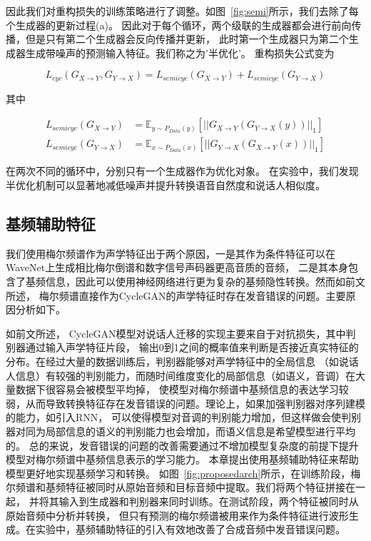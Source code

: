 因此我们对重构损失的训练策略进行了调整。如图~\ref{fig:semi}所示，我们去除了每个生成器的更新过程(a)。
因此对于每个循环，两个级联的生成器都会进行前向传播，但是只有第二个生成器会反向传播并更新，
此时第一个生成器只为第二个生成器生成带噪声的预测输入特征。我们称之为’半优化’。
重构损失公式变为

\begin{equation}
    L_{cyc}(G_{X\rightarrow Y},G_{Y\rightarrow X}) = L_{semicyc}(G_{X\rightarrow Y}) + L_{semicyc}(G_{Y\rightarrow X})
\end{equation}

其中

\begin{align}
    L_{semicyc}(G_{X\rightarrow Y}) & = \mathbb{E}_{y\sim P_{Data}(y)}\left[ \left| \left| G_{X\rightarrow Y}(G_{Y\rightarrow X}(y)) \right| \right|_1 \right] \\
    L_{semicyc}(G_{Y\rightarrow X}) & = \mathbb{E}_{x\sim P_{Data}(x)}\left[ \left| \left| G_{Y\rightarrow X}(G_{X\rightarrow Y}(x)) \right| \right|_1 \right]
\end{align}

在两次不同的循环中，分别只有一个生成器作为优化对象。
在实验中，我们发现半优化机制可以显著地减低噪声并提升转换语音自然度和说话人相似度。

\subsection{基频辅助特征}

我们使用梅尔频谱作为声学特征出于两个原因，一是其作为条件特征可以在WaveNet上生成相比梅尔倒谱和数字信号声码器更高音质的音频，
二是其本身包含了基频信息，因此可以使用神经网络进行更为复杂的基频隐性转换。然而如前文所述，
梅尔频谱直接作为CycleGAN的声学特征时存在发音错误的问题。主要原因分析如下。

如前文所述，
CycleGAN模型对说话人迁移的实现主要来自于对抗损失，其中判别器通过输入声学特征片段，
输出0到1之间的概率值来判断是否接近真实特征的分布。在经过大量的数据训练后，判别器能够对声学特征中的全局信息
（如说话人信息）有较强的判别能力，而随时间维度变化的局部信息（如语义，音调）在大量数据下很容易会被模型平均掉，
使模型对梅尔频谱中基频信息的表达学习较弱，从而导致转换特征存在发音错误的问题。理论上，如果加强判别器对序列建模的能力，如引入RNN，
可以使得模型对音调的判别能力增加，但这样做会使判别器对同为局部信息的语义的判别能力也会增加，而语义信息是希望模型进行平均的。
总的来说，发音错误的问题的改善需要通过不增加模型复杂度的前提下提升模型对梅尔频谱中基频信息表示的学习能力。
本章提出使用基频辅助特征来帮助模型更好地实现基频学习和转换。
如图~\ref{fig:proposedarch}所示，在训练阶段，梅尔频谱和基频特征被同时从原始音频和目标音频中提取。我们将两个特征拼接在一起，
并将其输入到生成器和判别器来同时训练。在测试阶段，两个特征被同时从原始音频中分析并转换，
但只有预测的梅尔频谱被用来作为条件特征进行波形生成。在实验中，基频辅助特征的引入有效地改善了合成音频中发音错误问题。

